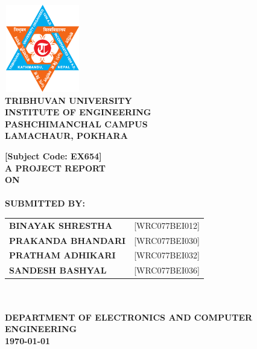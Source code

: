 \begin{titlingpage} 
    \begin{normalsize}
    \begin{center}
    \includegraphics[width=1.3in, height=1.5in]{./Graphics/logo.png}\\
    
     \textbf{TRIBHUVAN UNIVERSITY}\\
     \textbf{INSTITUTE OF ENGINEERING}\\
    
    \textbf{\MakeUppercase PASHCHIMANCHAL CAMPUS}\\
    \textbf{\MakeUppercase{Lamachaur, Pokhara}}
    \end{center}
    \vspace{1cm}
    
    \begin{center}
    \textbf{[Subject Code: EX654]}\\
    \textbf{A PROJECT REPORT}\\
    \textbf{ON}\\
    \textbf{\MakeUppercase \thetitle} \\
    \vspace{1.5 cm}
    \textbf{SUBMITTED BY:}\\
\begin{tabular}{p{5cm} l}
    \textbf{BINAYAK SHRESTHA} & [WRC077BEI012]\\
    \textbf{PRAKANDA BHANDARI} & [WRC077BEI030]\\
    \textbf{PRATHAM ADHIKARI} & [WRC077BEI032]\\
    \textbf{SANDESH BASHYAL} & [WRC077BEI036]\\
\end{tabular}\\
    \vspace{2 cm}
    \\
    \textbf{DEPARTMENT OF ELECTRONICS AND COMPUTER ENGINEERING}\\
    \vspace{1.5cm}
    \textbf{
    {\monthyeardate\today}}
    \end{center}
    \end{normalsize}
    \end{titlingpage}
    \newpage